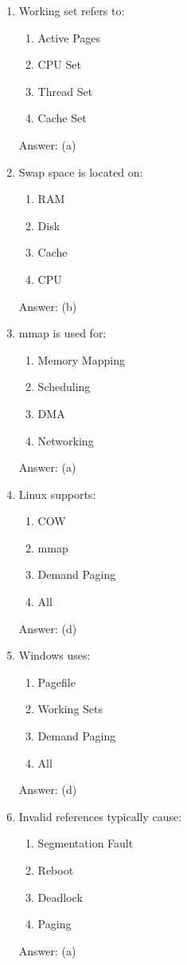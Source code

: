\begin{enumerate}
\item Working set refers to:
\begin{enumerate}[label=(\alph*)]
\item Active Pages
\item CPU Set
\item Thread Set
\item Cache Set
\end{enumerate}
Answer: (a)

\item Swap space is located on:
\begin{enumerate}[label=(\alph*)]
\item RAM
\item Disk
\item Cache
\item CPU
\end{enumerate}
Answer: (b)

\item mmap is used for:
\begin{enumerate}[label=(\alph*)]
\item Memory Mapping
\item Scheduling
\item DMA
\item Networking
\end{enumerate}
Answer: (a)

\item Linux supports:
\begin{enumerate}[label=(\alph*)]
\item COW
\item mmap
\item Demand Paging
\item All
\end{enumerate}
Answer: (d)

\item Windows uses:
\begin{enumerate}[label=(\alph*)]
\item Pagefile
\item Working Sets
\item Demand Paging
\item All
\end{enumerate}
Answer: (d)

\item Invalid references typically cause:
\begin{enumerate}[label=(\alph*)]
\item Segmentation Fault
\item Reboot
\item Deadlock
\item Paging
\end{enumerate}
Answer: (a)


\end{enumerate}
